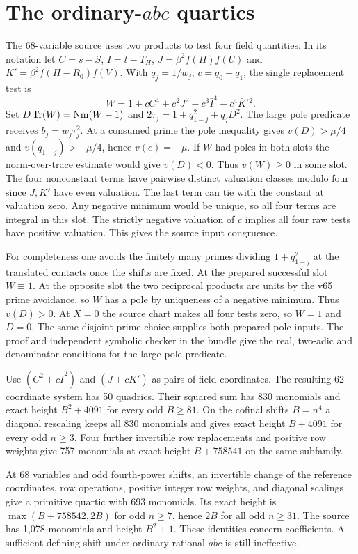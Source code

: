 \section{The ordinary-$abc$ quartics}
The 68-variable source uses two products to test four field quantities. In its notation let $C=s-S$, $I=t-T_H$, $J=\beta^2 f(H)f(U)$ and $K'=\beta^2 f(H-R_0)f(V)$. With $q_j=1/w_j$, $c=q_0+q_1$, the single replacement test is
\[
 W=1+c C^4+c^2J^2-c^3\bar I^4-c^4\bar K'{}^2 .
\]
Set $D\operatorname{Tr}(W)=\operatorname{Nm}(W-1)$ and $2\tau_j=1+q_{1-j}^2+q_jD^2$. The large pole predicate receives $b_j=w_j\tau_j^2$. At a consumed prime the pole inequality gives $v(D)>\mu/4$ and $v(q_{1-j})>-\mu/4$, hence $v(c)=-\mu$. If $W$ had poles in both slots the norm-over-trace estimate would give $v(D)<0$. Thus $v(W)\ge0$ in some slot. The four nonconstant terms have pairwise distinct valuation classes modulo four since $J,K'$ have even valuation. The last term can tie with the constant at valuation zero. Any negative minimum would be unique, so all four terms are integral in this slot. The strictly negative valuation of $c$ implies all four raw tests have positive valuation. This gives the source input congruence.

For completeness one avoids the finitely many primes dividing $1+q_{1-j}^2$ at the translated contacts once the shifts are fixed. At the prepared successful slot $W\equiv1$. At the opposite slot the two reciprocal products are units by the v65 prime avoidance, so $W$ has a pole by uniqueness of a negative minimum. Thus $v(D)>0$. At $X=0$ the source chart makes all four tests zero, so $W=1$ and $D=0$. The same disjoint prime choice supplies both prepared pole inputs. The proof and independent symbolic checker in the bundle give the real, two-adic and denominator conditions for the large pole predicate.

Use $(C^2\pm c\bar I^2)$ and $(J\pm c\bar K')$ as pairs of field coordinates. The resulting 62-coordinate system has 50 quadrics. Their squared sum has 830 monomials and exact height $B^2+4091$ for every odd $B\ge81$. On the cofinal shifts $B=n^4$ a diagonal rescaling keeps all 830 monomials and gives exact height $B+4091$ for every odd $n\ge3$. Four further invertible row replacements and positive row weights give 757 monomials at exact height $B+758541$ on the same subfamily.

At 68 variables and odd fourth-power shifts, an invertible change of the reference coordinates, row operations, positive integer row weights, and diagonal scalings give a primitive quartic with 693 monomials. Its exact height is $\max(B+758542,2B)$ for odd $n\ge7$, hence $2B$ for all odd $n\ge31$. The source has 1,078 monomials and height $B^2+1$. These identities concern coefficients. A sufficient defining shift under ordinary rational $abc$ is still ineffective.


